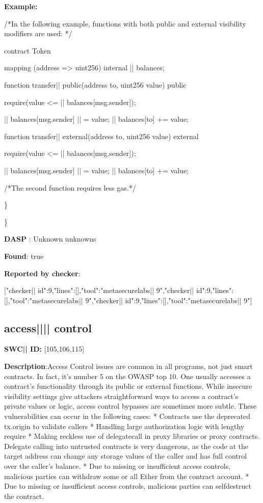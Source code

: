 \documentclass{article}
\begin{document}
\textbf{Example:} 
\begin{ffcode} 

 /*In the following example, functions with both public and external visibility modifiers are used: */ 

contract Token {

    mapping (address => uint256) internal |\textunderscore| balances;

    function transfer|\textunderscore| public(address to, uint256 value) public {
        require(value <= |\textunderscore| balances[msg.sender]);

        |\textunderscore| balances[msg.sender] |\textendash| = value;
        |\textunderscore| balances[to] += value;
    }

    function transfer|\textunderscore| external(address to, uint256 value) external {
        require(value <= |\textunderscore| balances[msg.sender]);

        |\textunderscore| balances[msg.sender] |\textendash| = value;
        |\textunderscore| balances[to] += value;
    }
}

 /*The second function requires less gas.*/ 

\end{ffcode} 
\} 

\} 

\textbf{DASP} : Unknown unknowns

\textbf{Found}: true

\textbf{Reported by checker}: 
\begin{ffcode} 

[{"checker|\textunderscore| id":9,"lines":[],"tool":"metasecurelabs|\textendash| 9"},{"checker|\textunderscore| id":9,"lines":[],"tool":"metasecurelabs|\textendash| 9"},{"checker|\textunderscore| id":9,"lines":[],"tool":"metasecurelabs|\textendash| 9"}]
\end{ffcode} 
\subsection{access{||\textunderscore|| }control} 
\textbf{SWC{|\textunderscore| }ID:} [105,106,115]

\textbf{Description}:Access Control issues are common in all programs, not just smart contracts. In fact, it's number 5 on the OWASP top 10. One usually accesses a contract's functionality through its public or external functions. While insecure visibility settings give attackers straightforward ways to access a contract's private values or logic, access control bypasses are sometimes more subtle. These vulnerabilities can occur in the following cases:
* Contracts use the deprecated tx.origin to validate callers
* Handling large authorization logic with lengthy require
* Making reckless use of delegatecall in proxy libraries or proxy contracts. Delegate calling into untrusted contracts is very dangerous, as the code at the target address can change any storage values of the caller and has full control over the caller's balance.
* Due to missing or insufficient access controls, malicious parties can withdraw some or all Ether from the contract account.
* Due to missing or insufficient access controls, malicious parties can self{\textendash}destruct the contract.
\end{document}
